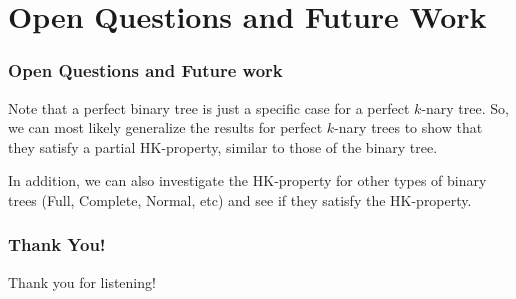 \documentclass[10pt,]{beamer}
\theoremstyle{conjectureStyle}
\theoremstyle{notationStyle}
\theoremstyle{claimStyle}
\begin{document}
\section{Open Questions and Future Work}
\begin{frame}\frametitle{Open Questions and Future work}
    Note that a perfect binary tree is just a specific case for a perfect $k$-nary tree. So, we can most likely generalize the results for perfect $k$-nary trees to show that they satisfy a partial HK-property, similar to those of the binary tree.

    In addition, we can also investigate the HK-property for other types of binary trees (Full, Complete, Normal, etc) and see if they satisfy the HK-property.
\end{frame}



\begin{frame}\frametitle{Thank You!}
    \begin{center}
        Thank you for listening!\\
    \end{center}
\end{frame}
\end{document}

